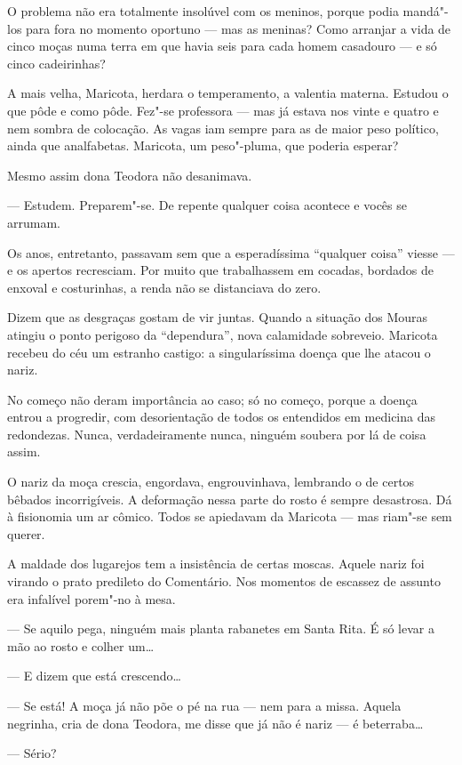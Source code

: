 O problema não era totalmente insolúvel com os meninos, porque podia
mandá"-los para fora no momento oportuno --- mas as meninas? Como
arranjar a vida de cinco moças numa terra em que havia seis para cada
homem casadouro --- e só cinco cadeirinhas?

A mais velha, Maricota, herdara o temperamento, a valentia materna.
Estudou o que pôde e como pôde. Fez"-se professora --- mas já estava nos
vinte e quatro e nem sombra de colocação. As vagas iam sempre para as de
maior peso político, ainda que analfabetas. Maricota, um peso"-pluma, que
poderia esperar?

Mesmo assim dona Teodora não desanimava.

--- Estudem. Preparem"-se. De repente qualquer coisa acontece e vocês se
arrumam.

Os anos, entretanto, passavam sem que a esperadíssima ``qualquer coisa''
viesse --- e os apertos recresciam. Por muito que trabalhassem em
cocadas, bordados de enxoval e costurinhas, a renda não se distanciava
do zero.

Dizem que as desgraças gostam de vir juntas. Quando a situação dos
Mouras atingiu o ponto perigoso da ``dependura'', nova calamidade
sobreveio. Maricota recebeu do céu um estranho castigo: a singularíssima
doença que lhe atacou o nariz.

No começo não deram importância ao caso; só no começo, porque a doença
entrou a progredir, com desorientação de todos os entendidos em medicina
das redondezas. Nunca, verdadeiramente nunca, ninguém soubera por lá de
coisa assim.

O nariz da moça crescia, engordava, engrouvinhava, lembrando o de certos
bêbados incorrigíveis. A deformação nessa parte do rosto é sempre
desastrosa. Dá à fisionomia um ar cômico. Todos se apiedavam da Maricota
--- mas riam"-se sem querer.

A maldade dos lugarejos tem a insistência de certas moscas. Aquele nariz
foi virando o prato predileto do Comentário. Nos momentos de escassez de
assunto era infalível porem"-no à mesa.

--- Se aquilo pega, ninguém mais planta rabanetes em Santa Rita. É só
levar a mão ao rosto e colher um\ldots{}

--- E dizem que está crescendo\ldots{}

--- Se está! A moça já não põe o pé na rua --- nem para a missa. Aquela
negrinha, cria de dona Teodora, me disse que já não é nariz --- é
beterraba\ldots{}

--- Sério?

